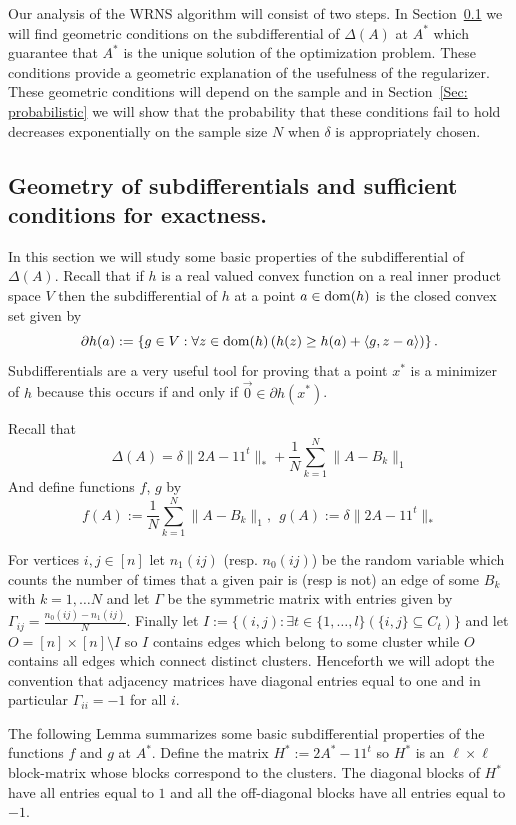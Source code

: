\documentclass[12pt]{amsart}
\theoremstyle{remark}
\begin{document}
Our analysis of the WRNS algorithm will consist of two steps. In Section~\ref{Sec: subdifferential} we will find geometric conditions on the subdifferential of $\Delta(A)$ at $A^*$ which guarantee that $A^*$ is the unique solution of the optimization problem. These conditions provide a geometric explanation of the usefulness of the regularizer. These geometric conditions will depend on the sample and in Section~\ref{Sec: probabilistic} we will show that the probability that these conditions fail to hold decreases exponentially on the sample size $N$ when $\delta$ is appropriately chosen.


\subsection{Geometry of subdifferentials and sufficient conditions for exactness.}
\label{Sec: subdifferential}

In this section we will study some basic properties of the subdifferential of $\Delta(A)$. Recall that if $h$ is a real valued convex function on a real inner product space $V$ then the subdifferential of $h$ at a point $a\in {\rm dom}(h)$ is the closed convex set given by
\[ \partial h(a):=\left\{g\in V: \forall z\in {\rm dom}(h)\left(h(z)\geq h(a)+\langle g, z-a\rangle\right)\right\}.\]
Subdifferentials are a very useful tool for proving that a point $x^*$ is a minimizer of $h$ because this occurs if and only if $\vec{0}\in \partial h(x^*)$. 

Recall that 
\[\Delta(A)= \delta\|2A-11^t\|_{*}+\frac{1}{N}\sum_{k=1}^N\|A-B_k\|_1\] 
And define functions $f$, $g$ by
\[
f(A):= \frac{1}{N}\sum_{k=1}^N\|A-B_k\|_1, \ \ g(A):= \delta\|2A-11^t\|_{*}
\]

For vertices $i,j\in [n]$ let $n_1(ij)$ (resp. $n_0(ij)$) be the random variable which counts the number of times that a given pair is (resp is not) an edge of some $B_k$ with $k=1,\dots N$ and let $\Gamma$ be the symmetric matrix with entries given by $\Gamma_{ij}=\frac{n_0(ij)-n_1(ij)}{N}$. 
Finally let $I:=\{(i,j): \exists t\in \{1,\dots,l\} \left( \{i,j\}\subseteq C_t\right)\}$ and let $O=[n]\times [n]\setminus I$ so $I$ contains edges which belong to some cluster while $O$ contains all edges which connect distinct clusters. Henceforth we will adopt the convention that adjacency matrices have diagonal entries equal to one and in particular $\Gamma_{ii}=-1$ for all $i$.


The following Lemma summarizes some basic subdifferential properties of the functions $f$ and $g$ at $A^*$. Define the matrix $H^*:=2A^*-11^t$ so $H^*$ is an $\ell\times \ell$ block-matrix whose blocks correspond to the clusters. The diagonal blocks of $H^*$ have all entries equal to $1$ and all the off-diagonal blocks have all entries equal to $-1$.
\end{document}
